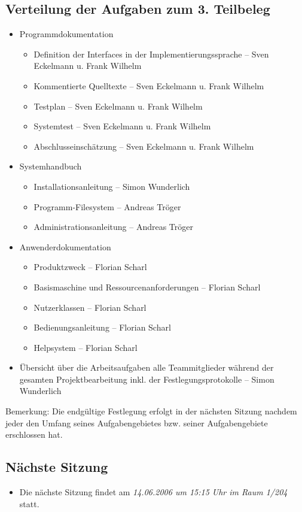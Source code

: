 			\subsection{Verteilung der Aufgaben zum 3. Teilbeleg}
			\begin{itemize}
			\item Programmdokumentation
			\begin{itemize}
			\item Definition der Interfaces in der Implementierungssprache -- Sven Eckelmann u. Frank 			Wilhelm
			\item Kommentierte Quelltexte -- Sven Eckelmann u. Frank Wilhelm
			\item Testplan -- Sven Eckelmann u. Frank Wilhelm
			\item Systemtest -- Sven Eckelmann u. Frank Wilhelm
			\item Abschlusseinschätzung -- Sven Eckelmann u. Frank Wilhelm
			\end{itemize}
			\item Systemhandbuch
			\begin{itemize}
			\item Installationsanleitung -- Simon Wunderlich
			\item Programm-Filesystem -- Andreas Tröger
			\item Administrationsanleitung -- Andreas Tröger
			\end{itemize}
			\item Anwenderdokumentation
			\begin{itemize}
			\item Produktzweck -- Florian Scharl
			\item Basismaschine und Ressourcenanforderungen -- Florian Scharl
			\item Nutzerklassen -- Florian Scharl
			\item Bedienungsanleitung -- Florian Scharl
			\item Helpsystem -- Florian Scharl
			\end{itemize}
			\item Übersicht über die Arbeitsaufgaben alle Teammitglieder während der gesamten Projektbearbeitung
			inkl. der Festlegungsprotokolle	-- Simon Wunderlich
			\end{itemize}
			Bemerkung: Die endgültige Festlegung erfolgt in der nächsten Sitzung nachdem jeder den Umfang 				seines Aufgabengebietes bzw. seiner Aufgabengebiete erschlossen hat.
			\subsection{Nächste Sitzung}
			\begin{itemize}
			\item Die nächste Sitzung findet am {\em 14.06.2006 um 15:15 Uhr im Raum 1/204 } statt.
			\end{itemize}
